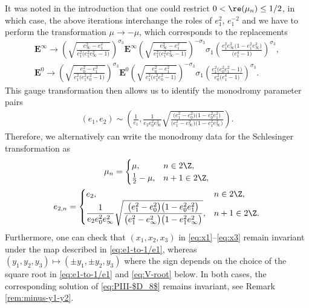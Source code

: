 \begin{Remark}
\label{remark:e2-mu-minus-mu-change}
It was noted in the introduction that one could restrict $0 < \re(\mu_n) \leq 1/2$, in which case, the above iterations interchange the roles of $e_1^2$, $e_1^{-2}$ and we have to perform the transformation $\mu\to -\mu$, which corresponds to the replacements
\begin{gather*}
\mathbf{E}^\infty\to \left(\sqrt{\frac{e_\infty^2-e_1^2}{e_1^2\big(e_1^2e_\infty^2-1\big)}}\right)^{\sigma_3}\mathbf{E}^\infty\left(\sqrt{\frac{e_\infty^2-e_1^2}{e_1^2\big(e_1^2e_\infty^2-1\big)}}\right)^{-\sigma_3}\sigma_1\left(\frac{e_1^2 e_\infty^2 \big(1-e_1^2 e_\infty^2\big)}{ \big(e_1^4-1\big)}\right)^{\sigma_3},\\
\mathbf{E}^0\to \left(\sqrt{\frac{e_0^2-e_1^2}{e_1^2\big(e_1^2e_0^2-1\big)}}\right)^{\sigma_3}\mathbf{E}^0\left(\sqrt{\frac{e_0^2-e_1^2}{e_1^2\big(e_1^2e_0^2-1\big)}}\right)^{-\sigma_3}\sigma_1\left(\frac{e_1^2 \big(e_0^2 e_1^2-1\big)}{ e_0^2 \big(e_1^4-1\big)}\right)^{\sigma_3}.
\end{gather*}
This gauge transformation then allows us to identify the monodromy parameter pairs
\begin{gather}
(e_1,e_2)\sim \left(\frac{1}{e_1},\frac{1}{e_2e_0^2e_\infty^2}\sqrt{\frac{\big(e_1^2-e_0^2\big)\big(1-e_0^2e_1^2\big)}{\big(e_1^2-e_\infty^2\big)\big(1-e_1^2e_\infty^2\big)}}\right).
\label{eq:e1-to-1/e1}
\end{gather}
Therefore, we alternatively can write the monodromy data for the Schlesinger transformation as
\begin{gather*}
\mu_n = \begin{cases} \mu, & n \in 2\Z, \\ \frac{1}{2}-\mu, & n +1 \in 2\Z, \end{cases} \\
 e_{2,n}=\begin{cases} e_2, & n \in 2\Z, \\ \dfrac{1}{e_2e_0^2e_\infty^2}\sqrt{\dfrac{\big(e_1^2-e_0^2\big)\big(1-e_0^2e_1^2\big)}{\big(e_1^2-e_\infty^2\big)\big(1-e_1^2e_\infty^2\big)}}, & n +1 \in 2\Z. \end{cases}
\end{gather*}
Furthermore, one can check that $(x_1, x_2, x_3)$ in \eqref{eq:x1}--\eqref{eq:x3} remain invariant under the map described in \eqref{eq:e1-to-1/e1}, whereas $(y_1, y_2, y_3) \mapsto (\pm y_1, \pm y_2, y_3)$ where the sign depends on the choice of the square root in \eqref{eq:e1-to-1/e1} and \eqref{eq:V-root} below. In both cases, the corresponding solution of \eqref{eq:PIII-$D_8$} remains invariant, see Remark \ref{rem:minus-y1-y2}.
\end{Remark}

